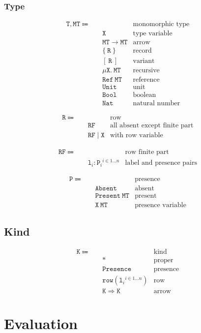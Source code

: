 \documentclass[a4paper]{article}
\newcommand{\code}{\mathtt}
\begin{document}
\subsubsection{Type}

\begin{align*}
\code{T, MT} \Coloneqq \quad & & \text{monomorphic type} \\
& \code{X} & \text{type variable} \\
& \code{MT \rightarrow MT} & \text{arrow} \\
& \code{\{\ R\ \}} & \text{record} \\
& \code{[\ R\ ]} & \text{variant} \\
& \code{\mu X.\ MT} & \text{recursive} \\
& \code{Ref\ MT} & \text{reference} \\
& \code{Unit} & \text{unit} \\
& \code{Bool} & \text{boolean} \\
& \code{Nat} & \text{natural number}
\end{align*}

\begin{align*}
\code{R} \Coloneqq \quad & & \text{row} \\
& \code{RF} & \text{all absent except finite part} \\
& \code{RF \mid X} & \text{with row variable}
\end{align*}

\begin{align*}
\code{RF} \Coloneqq \quad & & \text{row finite part} \\
& {\code{l}_i : \code{P}_i}^{i \in 1\dots n} & \text{label and presence pairs}
\end{align*}

\begin{align*}
\code{P} \Coloneqq \quad & & \text{presence} \\
& \code{Absent} & \text{absent} \\
& \code{Present\ MT} & \text{present} \\
& \code{X\ MT} & \text{presence variable}
\end{align*}

\subsection{Kind}

\begin{align*}
\code{K} \Coloneqq \quad & & \text{kind} \\
& \code{*} & \text{proper} \\
& \code{Presence} & \text{presence} \\
& \code{row}({\code{l}_i}^{i \in 1\dots n}) & \text{row} \\
& \code{K \Rightarrow K} & \text{arrow}
\end{align*}

\section{Evaluation}
\end{document}
